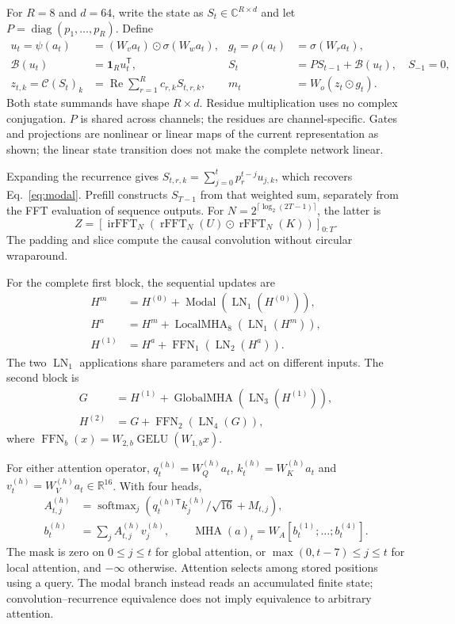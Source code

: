 \documentclass[11pt,letterpaper]{article}
\begin{document}
For $R=8$ and $d=64$, write the state as $S_t\in\mathbb C^{R\times d}$ and let $P=\operatorname{diag}(p_1,\ldots,p_R)$. Define
\begin{align}
 u_t=\psi(a_t)&=(W_v a_t)\odot\sigma(W_w a_t),&
 g_t=\rho(a_t)&=\sigma(W_r a_t),\\
 \mathcal B(u_t)&=\mathbf 1_R u_t^{\mathsf T},&
 S_t&=P S_{t-1}+\mathcal B(u_t),\quad S_{-1}=0,\\
 z_{t,k}=\mathcal C(S_t)_k&=\operatorname{Re}\sum_{r=1}^{R}c_{r,k}S_{t,r,k},&
 m_t&=W_o(z_t\odot g_t).
\end{align}
Both state summands have shape $R\times d$. Residue multiplication uses no complex conjugation. $P$ is shared across channels; the residues are channel-specific. Gates and projections are nonlinear or linear maps of the current representation as shown; the linear state transition does not make the complete network linear.

Expanding the recurrence gives $S_{t,r,k}=\sum_{j=0}^{t}p_r^{t-j}u_{j,k}$, which recovers Eq.~\eqref{eq:modal}. Prefill constructs $S_{T-1}$ from that weighted sum, separately from the FFT evaluation of sequence outputs. For $N=2^{\lceil\log_2(2T-1)\rceil}$, the latter is
\begin{equation}
 Z=\left[\operatorname{irFFT}_{N}\left(
 \operatorname{rFFT}_{N}(U)\odot\operatorname{rFFT}_{N}(K)\right)\right]_{0:T}.
\end{equation}
The padding and slice compute the causal convolution without circular wraparound.

For the complete first block, the sequential updates are
\begin{align}
 H^m&=H^{(0)}+\operatorname{Modal}(\operatorname{LN}_1(H^{(0)})),\\
 H^a&=H^m+\operatorname{LocalMHA}_{8}(\operatorname{LN}_1(H^m)),\\
 H^{(1)}&=H^a+\operatorname{FFN}_1(\operatorname{LN}_2(H^a)).
\end{align}
The two $\operatorname{LN}_1$ applications share parameters and act on different inputs. The second block is
\begin{align}
 G&=H^{(1)}+\operatorname{GlobalMHA}(\operatorname{LN}_3(H^{(1)})),\\
 H^{(2)}&=G+\operatorname{FFN}_2(\operatorname{LN}_4(G)),
\end{align}
where $\operatorname{FFN}_b(x)=W_{2,b}\operatorname{GELU}(W_{1,b}x)$.

For either attention operator, $q_t^{(h)}=W_Q^{(h)}a_t$, $k_t^{(h)}=W_K^{(h)}a_t$ and $v_t^{(h)}=W_V^{(h)}a_t\in\mathbb R^{16}$. With four heads,
\begin{align}
 A_{t,j}^{(h)}&=\operatorname{softmax}_{j}\left(q_t^{(h)\mathsf T}k_j^{(h)}/\sqrt{16}+M_{t,j}\right),\\
 b_t^{(h)}&=\sum_j A_{t,j}^{(h)}v_j^{(h)},\qquad
 \operatorname{MHA}(a)_t=W_A[b_t^{(1)};\ldots;b_t^{(4)}].
\end{align}
The mask is zero on $0\le j\le t$ for global attention, or $\max(0,t-7)\le j\le t$ for local attention, and $-\infty$ otherwise. Attention selects among stored positions using a query. The modal branch instead reads an accumulated finite state; convolution--recurrence equivalence does not imply equivalence to arbitrary attention.
\end{document}
